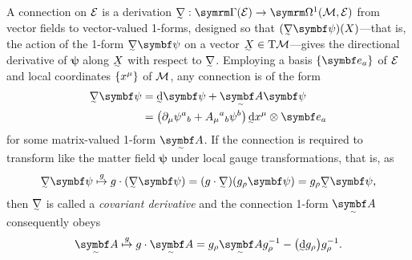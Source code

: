 A connection on $\cal E$ is a derivation\footnotemark{} $\ts\nabla : \secs(\cal E) \to \forms^1(\cal M, \cal E)$ from vector fields to vector-valued 1-forms, designed so that $(\ts\nabla\bm\psi)(X)$---that is, the action of the 1-form $\ts\nabla\bm\psi$ on a vector $\ts X \in \T\cal M$---gives the directional derivative of $\bm\psi$ along $\ts X$ with respect to $\ts\nabla$.
Employing a basis $\qty{\bm e_a}$ of $\cal E$ and local coordinates $\qty{x^\mu}$ of $\cal M$, any connection is of the form
\begin{align}
	\ts\nabla \bm\psi &= \ts\dd\bm\psi + \tsbm A\bm\psi
\\	&= \qty(\partial_\mu\psi^a{}_b + A_\mu{}^a{}_b\psi^b) \, \ts\dd x^\mu \otimes \bm e_a
\end{align}
for some matrix-valued 1-form $\tsbm A$.
If the connection is required to transform like the matter field $\bm\psi$ under local gauge transformations, that is, as
\begin{align}
	\ts\nabla\bm\psi \overset{g}{\mapsto} g\cdot(\ts\nabla\bm\psi)
	= (g\cdot\ts\nabla)(g_\rho\bm\psi)
	= g_\rho\ts\nabla\bm\psi
,\end{align}
then $\ts\nabla$ is called a \emph{covariant derivative} and the connection 1-form $\tsbm A$ consequently obeys
\begin{align}
	\tsbm A \overset{g}{\mapsto} g\cdot\tsbm A = g_\rho\tsbm A g_\rho^{-1} - \qty(\ts\dd g_\rho)g_\rho^{-1}
.\end{align}

